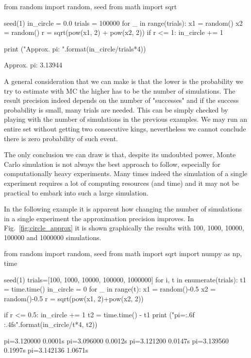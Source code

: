 \begin{ipython}
from random import random, seed
from math import sqrt

seed(1)
in_circle = 0.0
trials = 100000
for _ in range(trials):
    x1 = random()
    x2 = random()
    r = sqrt(pow(x1, 2) + pow(x2, 2))
    if r <= 1:
        in_circle += 1

print ("Approx. pi: {}".format(in_circle/trials*4))
\end{ipython}
\begin{ioutput}
Approx. pi: 3.13944
\end{ioutput}

A general consideration that we can make is that the lower is the probability we try to estimate with MC the higher has to be the number of simulations. 
The result precision indeed depends on the number of "successes" and if the success probability is small, many trials are needed. This can be simply checked by playing with the number of simulations in the previous examples. We may run an entire set without getting two consecutive kings, nevertheless we cannot conclude there is zero probability of such event.

The only conclusion we can draw is that, despite its undoubted power, Monte Carlo simulation is not always the best approach to follow, especially for computationally heavy experiments. Many times indeed the simulation of a single experiment requires a lot of computing resources (and time) and it may not be practical to embark into such a large simulation.

In the following example it is apparent how changing the number of simulations in a single experiment the approximation precision improves. In Fig.~\ref{fig:circle_approx} it is shown graphically the results with 100, 1000, 10000, 100000 and 1000000 simulations.

\begin{ipython}
from random import random, seed
from math import sqrt
import numpy as np, time

seed(1)
trials=[100, 1000, 10000, 100000, 1000000]
for i, t in enumerate(trials):
    t1 = time.time()
    in_circle = 0
    for _ in range(t):
        x1 = random()-0.5
        x2 = random()-0.5
        r = sqrt(pow(x1, 2)+pow(x2, 2))

        if r <= 0.5:
            in_circle += 1
    t2 = time.time() - t1
    print ("pi={:.6f} {:.4f}s".format(in_circle/t*4, t2))
\end{ipython}
\begin{ioutput}
pi=3.120000 0.0001s
pi=3.096000 0.0012s
pi=3.121200 0.0147s
pi=3.139560 0.1997s
pi=3.142136 1.0671s
\end{ioutput}

